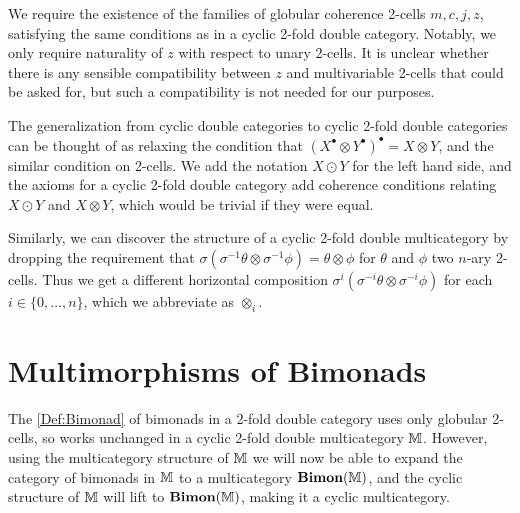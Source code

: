 We require the existence of the families of globular coherence 2-cells $m,c,j,z$, satisfying the same conditions as in a cyclic 2-fold double category. Notably, we only require naturality of $z$ with respect to unary 2-cells. It is unclear whether there is any sensible compatibility between $z$ and multivariable 2-cells that could be asked for, but such a compatibility is not needed for our purposes.

\begin{remark}
	The generalization from cyclic double categories to cyclic 2-fold double categories can be thought of as relaxing the condition that $(X^{\bullet}\otimes Y^{\bullet})^{\bullet}=X\otimes Y$, and the similar condition on 2-cells. We add the notation $X\odot Y$ for the left hand side, and the axioms for a cyclic 2-fold double category add coherence conditions relating $X\odot Y$ and $X\otimes Y$, which would be trivial if they were equal.

	Similarly, we can discover the structure of a cyclic 2-fold double multicategory by dropping the requirement that $\sigma(\sigma^{-1}\theta\otimes\sigma^{-1}\phi)=\theta\otimes\phi$ for $\theta$ and $\phi$ two $n$-ary 2-cells. Thus we get a different horizontal composition $\sigma^i(\sigma^{-i}\theta\otimes\sigma^{-i}\phi)$ for each $i\in\{0,\dots,n\}$, which we abbreviate as $\otimes_i$.
\end{remark}

\section{Multimorphisms of Bimonads}

The \cref{Def:Bimonad} of bimonads in a 2-fold double category uses only globular 2-cells, so works unchanged in a cyclic 2-fold double multicategory $\mathbb{M}$. However, using the multicategory structure of $\mathbb{M}$ we will now be able to expand the category of bimonads in $\mathbb{M}$ to a multicategory $\mathbf{Bimon}(\mathbb{M})$, and the cyclic structure of $\mathbb{M}$ will lift to $\mathbf{Bimon}(\mathbb{M})$, making it a cyclic multicategory.

